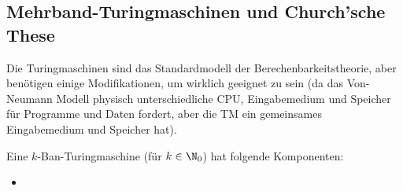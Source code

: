 \newsection
\subsection{Mehrband-Turingmaschinen und Church'sche These}
Die Turingmaschinen sind das Standardmodell der Berechenbarkeitstheorie, aber benötigen einige Modifikationen, um wirklich geeignet zu sein 
(da das Von-Neumann Modell physisch unterschiedliche CPU, Eingabemedium und Speicher für Programme und Daten fordert, aber die TM ein gemeinsames Eingabemedium und Speicher hat).

Eine $k$-Ban-Turingmaschine (für $k \in \N_0$) hat folgende Komponenten:
\begin{itemize}
    \item 
\end{itemize}

